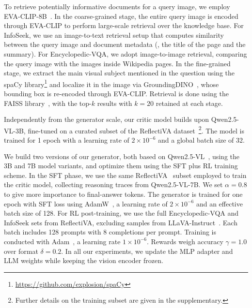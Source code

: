 To retrieve potentially informative documents for a query image, we employ EVA-CLIP-8B~\cite{sun2024eva}. 
In the coarse-grained stage, the entire query image is encoded through EVA-CLIP to perform large-scale retrieval over the knowledge base.
For InfoSeek, we use an image-to-text retrieval setup that computes similarity between the query image and document metadata (\ie, the title of the page and the summary). For Encyclopedic-VQA, we adopt image-to-image retrieval, comparing the query image with the images inside Wikipedia pages.
In the fine-grained stage, we extract the main visual subject mentioned in the question using the spaCy library\footnote{\url{https://github.com/explosion/spaCy}} and localize it in the image via GroundingDINO~\cite{liu2023grounding}, whose bounding box is re-encoded through EVA-CLIP. Retrieval is done using the FAISS library~\cite{johnson2019billion}, with the top-$k$ results with $k=20$ retained at each stage.

Independently from the generator scale, our critic model builds upon Qwen2.5-VL-3B, fine-tuned on a curated subset of the ReflectiVA dataset~\cite{cocchi2025augmenting}\footnote{Further details on the training subset are given in the supplementary.}.
The model is trained for 1 epoch with a learning rate of $2 \times 10^{-6}$ and a global batch size of $32$.

We build two versions of our generator, both based on Qwen2.5-VL~\cite{bai2025qwen2}, using the 3B and 7B model variants, and optimize them using the SFT plus RL training scheme. In the SFT phase, we use the same ReflectiVA~\cite{cocchi2025augmenting} subset employed to train the critic model, collecting reasoning traces from Qwen2.5-VL-7B. We set $\alpha=0.8$ to give more importance to final-answer tokens. The generator is trained for one epoch with SFT loss using AdamW~\cite{loshchilovdecoupled},
a learning rate of $2\times10^{-6}$ and an effective batch size of 128.
For RL post-training, we use the full Encyclopedic-VQA and InfoSeek sets from ReflectiVA, excluding samples from LLaVA-Instruct~\cite{liu2023improved}. Each batch includes 128 prompts with 8 completions per prompt. 
Training is conducted with Adam~\cite{kingma2015adam}, a learning rate $1\times10^{-6}$. Rewards weigh accuracy $\gamma=1.0$ over format $\delta=0.2$.
In all our experiments, we update the MLP adapter and LLM weights while keeping the vision encoder frozen. 

